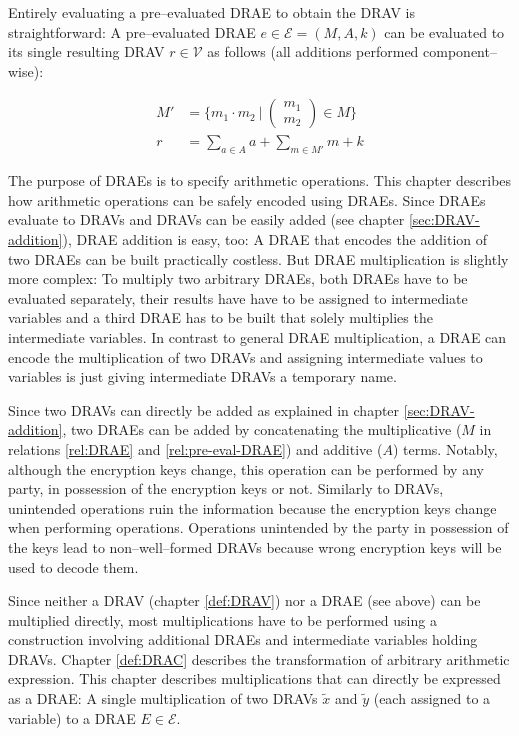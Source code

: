 Entirely evaluating a pre--evaluated DRAE to obtain the DRAV is straightforward:
A pre--evaluated DRAE $e \in \mathcal{E} = (M,A, k)$ can be evaluated to its
single resulting DRAV $r \in \mathcal{V}$ as follows (all additions performed
component--wise):

\begin{align*}
M' &= \Bigg\{ m_1 \cdot m_2\ \Bigg|\ \begin{pmatrix}m_1\\m_2\end{pmatrix}
\in M \Bigg\} \\
r & = \sum_{a \in A}a + \sum_{m \in M'}m + k
\end{align*}



The purpose of DRAEs is to specify arithmetic operations. This chapter describes
how arithmetic operations can be safely encoded using DRAEs. Since DRAEs
evaluate to DRAVs and DRAVs can be easily added (see chapter
\ref{sec:DRAV-addition}), DRAE addition is easy, too: A DRAE that encodes the
addition of two DRAEs can be built practically costless. But DRAE multiplication
is slightly more complex: To multiply two arbitrary DRAEs, both DRAEs have to be
evaluated separately, their results have have to be assigned to intermediate
variables and a third DRAE has to be built that solely multiplies the
intermediate variables. In contrast to general DRAE multiplication, a DRAE can
encode the multiplication of two DRAVs and assigning intermediate values to
variables is just giving intermediate DRAVs a temporary name.


\label{sec:DRAE-addition}

Since two DRAVs can directly be added as explained in chapter
\ref{sec:DRAV-addition}, two DRAEs can be added by concatenating the
multiplicative ($M$ in relations \ref{rel:DRAE} and \ref{rel:pre-eval-DRAE}) and
additive ($A$) terms. Notably, although the encryption keys change, this
operation can be performed by any party, in possession of the encryption keys or
not. Similarly to DRAVs, unintended operations ruin the information because the
encryption keys change when performing operations. Operations unintended by the
party in possession of the keys lead to non--well--formed DRAVs because wrong
encryption keys will be used to decode them.


\label{sec:DRAE-multiplication}

Since neither a DRAV (chapter \ref{def:DRAV}) nor a DRAE (see above) can be
multiplied directly, most multiplications have to be performed using a
construction involving additional DRAEs and intermediate variables holding
DRAVs. Chapter \ref{def:DRAC} describes the transformation of arbitrary
arithmetic expression. This chapter describes multiplications that can directly
be expressed as a DRAE: A single multiplication of two DRAVs $\widetilde{x}$ and
$\widetilde{y}$ (each assigned to a variable) to a DRAE $E \in \mathcal{E}$.

